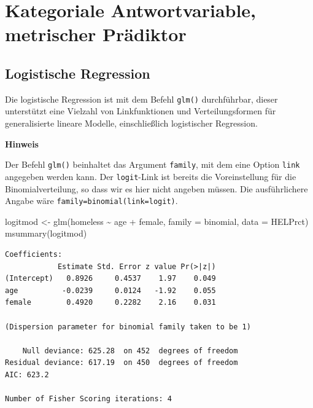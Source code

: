 \documentclass[
  ngerman,
]{scrbook}
\newenvironment{Shaded}{\begin{snugshade}}{\end{snugshade}}
\newcommand{\AttributeTok}[1]{\textcolor[rgb]{0.77,0.63,0.00}{#1}}
\newcommand{\FunctionTok}[1]{\textcolor[rgb]{0.00,0.00,0.00}{#1}}
\newcommand{\NormalTok}[1]{#1}
\newcommand{\OtherTok}[1]{\textcolor[rgb]{0.56,0.35,0.01}{#1}}
\newcommand{\SpecialCharTok}[1]{\textcolor[rgb]{0.00,0.00,0.00}{#1}}
\newenvironment{hinweis}[1]
  {
  \begin{itemize}
  \renewcommand{\labelitemi}{
    \raisebox{1.8\height}[0pt][0pt]{
      {\setkeys{Gin}{width=7em,keepaspectratio}
        {\Large \textcolor{dark-fom-green}\faHandORight}}
        }
  }
  \begin{blackbox}
        \bgroup\color{dark-fom-green}
          {\textbf{Hinweis}}
        \egroup
  \item
  }
  {
  \end{blackbox}
  \end{itemize}
  }
\begin{document}
\hypertarget{kategoriale-antwortvariable-metrischer-pruxe4diktor}{%
\chapter{Kategoriale Antwortvariable, metrischer Prädiktor}\label{kategoriale-antwortvariable-metrischer-pruxe4diktor}}

\hypertarget{logistische-regression}{%
\section{Logistische Regression}\label{logistische-regression}}

Die logistische Regression ist mit dem Befehl \texttt{glm()} durchführbar, dieser unterstützt eine Vielzahl von Linkfunktionen und Verteilungsformen für generalisierte lineare Modelle, einschließlich logistischer Regression.

\begin{hinweis}{hinweis}
Der Befehl \texttt{glm()} beinhaltet das Argument \texttt{family}, mit dem eine Option \texttt{link} angegeben werden kann. Der \texttt{logit}-Link ist bereits die Voreinstellung für die Binomialverteilung, so dass wir es hier nicht angeben müssen. Die ausführlichere Angabe wäre \texttt{family=binomial(link=logit)}.

\end{hinweis}

\begin{Shaded}
\begin{Highlighting}[]
\NormalTok{logitmod }\OtherTok{\textless{}{-}} \FunctionTok{glm}\NormalTok{(homeless }\SpecialCharTok{\textasciitilde{}}\NormalTok{ age }\SpecialCharTok{+}\NormalTok{ female, }
                \AttributeTok{family =}\NormalTok{ binomial, }\AttributeTok{data =}\NormalTok{ HELPrct)}
\FunctionTok{msummary}\NormalTok{(logitmod)}
\end{Highlighting}
\end{Shaded}

\begin{verbatim}
Coefficients:
            Estimate Std. Error z value Pr(>|z|)
(Intercept)   0.8926     0.4537    1.97    0.049
age          -0.0239     0.0124   -1.92    0.055
female        0.4920     0.2282    2.16    0.031

(Dispersion parameter for binomial family taken to be 1)

    Null deviance: 625.28  on 452  degrees of freedom
Residual deviance: 617.19  on 450  degrees of freedom
AIC: 623.2

Number of Fisher Scoring iterations: 4
\end{verbatim}
\end{document}
